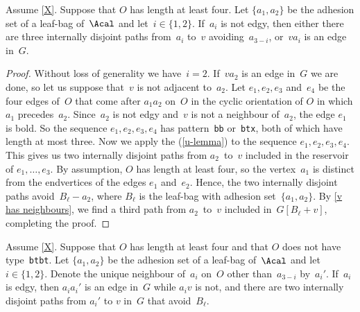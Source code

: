 \documentclass{aic}
\theoremstyle{plain}
\theoremstyle{definition}
\theoremstyle{plain}
\theoremstyle{plain}
\newcommand{\ty}[1]{{\tt#1}}
\begin{document}
\begin{lem}\label{find 3 paths}
Assume \autoref{X}.
Suppose that $O$ has length at least four.
Let $\{a_1,a_2\}$ be the adhesion set of a leaf-bag of~$\Acal$ and let~$i\in\{1,2\}$.
If~$a_i$ is not edgy, then either there are three internally disjoint paths from~$a_i$ to~$v$ avoiding~$a_{3-i}$, or~$va_i$ is an 
edge in~$G$.
\end{lem}

\begin{proof}
Without loss of generality we have~$i=2$.
If~$va_2$ is an edge in~$G$ we are done, so let us suppose that~$v$ is not adjacent to~$a_2$.
Let $e_1,e_2,e_3$ and~$e_4$ be the four edges of~$O$ that come after $a_1a_2$ on~$O$ in the 
cyclic orientation of $O$ in which $a_1$ precedes~$a_2$. 
Since~$a_2$ is not edgy and~$v$ is not a neighbour of~$a_2$, 
the edge $e_1$ is bold. 
So the sequence $e_1, e_2, e_3, e_4$ has pattern~\ty{bb} or~\ty{btx}, both of which have length at most three. 
Now we apply the  (\ref{u-lemma}) to the sequence $e_1, e_2, e_3, e_4$. 
This gives us two internally 
disjoint paths  from 
$a_2$~to~$v$ included in the reservoir of $e_1,\ldots,e_3$. 
By assumption, $O$ has length at least four, so the vertex~$a_1$ is distinct from the endvertices of the edges 
$e_1$ and~$e_2$. Hence, the two internally disjoint paths avoid~$B_\ell-a_2$, where $B_\ell$ is the leaf-bag with adhesion set~$\{a_1,a_2\}$. 
By \autoref{v has neighbours}, we find a third path from $a_2$~to~$v$ 
included in~$G[B_\ell+v]$, completing the proof.
\end{proof}



\begin{lem}\label{find 2 paths}
Assume \autoref{X}.
Suppose that $O$ has length at least four and that $O$ does not have type~\ty{btbt}.
Let $\{a_1,a_2\}$ be the adhesion set of a leaf-bag of~$\Acal$ and let~$i\in\{1,2\}$.
Denote the unique neighbour of~$a_i$ on~$O$ other than~$a_{3-i}$ by~$a_i'$.
If~$a_i$ is edgy, then $a_i a_i'$ is an edge in~$G$ while $a_i v$ is not, and there are two internally 
disjoint paths from $a_i'$ to $v$ in~$G$ that avoid~$B_\ell$.
\end{lem}
\end{document}
